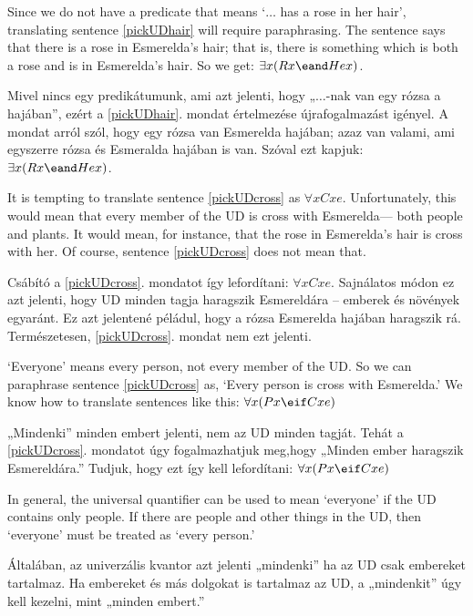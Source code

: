 Since we do not have a predicate that means `$\ldots$ has a rose in her hair', translating sentence \ref{pickUDhair} will require paraphrasing. The sentence says that there is a rose in Esmerelda's hair; that is, there is something which is both a rose and is in Esmerelda's hair. So we get: $\exists x(Rx \eand Hex)$.

Mivel nincs egy predikátumunk, ami azt jelenti, hogy „$\ldots$-nak van egy rózsa a hajában”, ezért a \ref{pickUDhair}. mondat értelmezése újrafogalmazást igényel. A mondat arról szól, hogy egy rózsa van Esmerelda hajában; azaz van valami, ami egyszerre rózsa és Esmeralda hajában is van. Szóval ezt kapjuk: $\exists x(Rx \eand Hex)$.



It is tempting to translate sentence \ref{pickUDcross} as $\forall x Cxe$. Unfortunately, this would mean that every member of the UD is cross with Esmerelda--- both people and plants. It would mean, for instance, that the rose in Esmerelda's hair is cross with her. Of course, sentence \ref{pickUDcross} does not mean that.

Csábító a \ref{pickUDcross}. mondatot így lefordítani: $\forall x Cxe$. Sajnálatos módon ez azt jelenti, hogy UD minden tagja haragszik Esmereldára -- emberek és növények egyaránt. Ez azt jelentené péládul, hogy a rózsa Esmerelda hajában haragszik rá. Természetesen, \ref{pickUDcross}. mondat nem ezt jelenti.

`Everyone' means every person, not every member of the UD. So we can paraphrase sentence \ref{pickUDcross} as, `Every person is cross with Esmerelda.' We know how to translate sentences like this: $\forall x(Px \eif Cxe)$

„Mindenki” minden embert jelenti, nem az UD minden tagját. Tehát a \ref{pickUDcross}. mondatot úgy fogalmazhatjuk meg,hogy  „Minden ember haragszik Esmereldára.” Tudjuk, hogy ezt így kell lefordítani: $\forall x(Px \eif Cxe)$

In general, the universal quantifier can be used to mean `everyone' if the UD contains only people. If there are people and other things in the UD, then `everyone' must be treated as `every person.'

Általában, az univerzális kvantor azt jelenti „mindenki” ha az UD csak embereket tartalmaz. Ha embereket és más dolgokat is tartalmaz az UD, a „mindenkit” úgy kell kezelni, mint „minden embert.”





